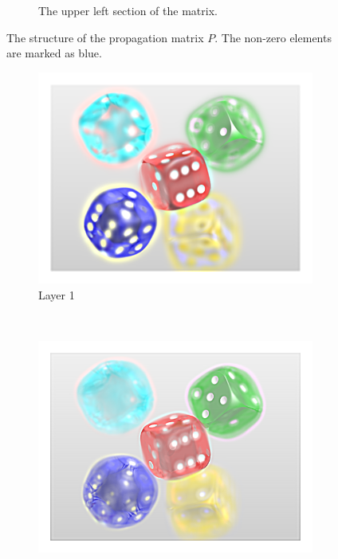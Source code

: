 \documentclass[11pt,a4paper,titlepage]{article}
\begin{document}
\begin{figure}[h]
\begin{subfigure}[c]{\textwidth}
		\caption{The upper left section of the matrix.}
		\label{fig:P_orthographic_section}
	\end{subfigure}
	\caption{The structure of the propagation matrix $P$. The non-zero elements are marked as blue.}
\end{figure}

\newpage

\begin{figure}[h]
	\centering
	\begin{subfigure}[c]{0.3\textwidth}
 		\includegraphics[width=\textwidth]{results/dice_orthographic_rec_fov10_blurry_3Layers/1.png}
  		\caption{Layer 1}
	\end{subfigure}%
	~
	\begin{subfigure}[c]{0.3\textwidth}
		\includegraphics[width=\textwidth]{results/dice_orthographic_rec_fov10_blurry_3Layers/2.png}

\end{subfigure}
\end{figure}
\end{document}
